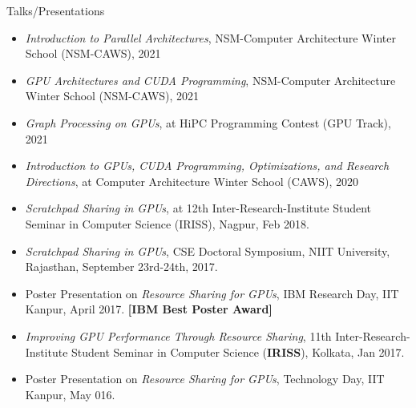 \documentclass{resume} %
\begin{document}
\begin{rSection}{Talks/Presentations}
\begin{itemize}
\item \textit{Introduction to Parallel Architectures}, NSM-Computer Architecture Winter School (NSM-CAWS), 2021
\item \textit{GPU Architectures and CUDA Programming}, NSM-Computer Architecture Winter School (NSM-CAWS), 2021	
\item \textit{Graph Processing on GPUs}, at HiPC Programming Contest (GPU Track), 2021
\item \textit{Introduction to GPUs, CUDA Programming, Optimizations, and Research Directions}, at Computer Architecture Winter School (CAWS), 2020
\item \textit{Scratchpad Sharing in GPUs}, at 12th Inter-Research-Institute Student Seminar in Computer Science (IRISS), Nagpur, Feb 2018. 
\item \textit{Scratchpad Sharing in GPUs}, CSE Doctoral Symposium, NIIT University, Rajasthan, September 23rd-24th, 2017.
\item Poster Presentation on \textit{Resource Sharing for GPUs}, IBM Research Day, IIT Kanpur, April 2017. \textbf{[IBM Best Poster Award]} 
\item \textit{Improving GPU Performance Through Resource Sharing}, 11th Inter-Research-Institute Student Seminar in Computer Science (\textbf{IRISS}), Kolkata, Jan 2017.
\item Poster Presentation on \textit{Resource Sharing for GPUs}, Technology Day, IIT Kanpur, May 016. 

\end{itemize}
\end{rSection}


\end{document}
